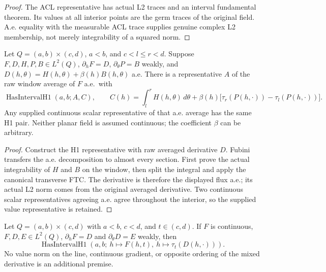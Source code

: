 \begin{proof}
\leanok
The ACL representative has actual L2 traces and an interval fundamental theorem.
Its values at all interior points are the germ traces of the original field.
A.e. equality with the measurable ACL trace supplies genuine complex L2
membership, not merely integrability of a squared norm.
\end{proof}

\begin{lemma}
\label{lem:rough-window-flux}
\leanok
Let $Q=(a,b)\times(c,d)$, $a<b$, and $c<l\le r<d$.
Suppose $F,D,H,P,B\in L^2(Q)$,
$\partial_hF=D$, $\partial_\theta P=B$ weakly, and
$D(h,\theta)=H(h,\theta)+\beta(h)B(h,\theta)$ a.e.
There is a representative $A$ of the raw window average of $F$ a.e.\ with
\[
 \operatorname{HasIntervalH1}(a,b;A,C),\qquad
 C(h)=\int_l^rH(h,\theta)\,d\theta+
       \beta(h)\bigl[\tau_r(P(h,\cdot))-\tau_l(P(h,\cdot))\bigr].
\]
Any supplied continuous scalar representative of that a.e. average has the
same H1 pair. Neither planar field is assumed continuous; the coefficient
$\beta$ can be arbitrary.
\end{lemma}

\begin{proof}
\leanok
Construct the H1 representative with raw averaged derivative $D$.
Fubini transfers the a.e. decomposition to almost every section.
First prove the actual integrability of $H$ and $B$ on the window, then
split the integral and apply the canonical transverse FTC.
The derivative is therefore the displayed flux a.e.; its actual L2 norm
comes from the original averaged derivative.
Two continuous scalar representatives agreeing a.e. agree throughout
the interior, so the supplied value representative is retained.
\end{proof}

\begin{lemma}
\label{lem:tangential-interior-trace}
\leanok
Let $Q=(a,b)\times(c,d)$ with $a<b$, $c<d$, and $t\in(c,d)$.
If $F$ is continuous, $F,D,E\in L^2(Q)$,
$\partial_hF=D$ and $\partial_\theta D=E$ weakly, then
\[
 \operatorname{HasIntervalH1}
   (a,b;\ h\mapsto F(h,t),\ h\mapsto\tau_t(D(h,\cdot))).
\]
No value norm on the line, continuous gradient, or opposite ordering of the
mixed derivative is an additional premise.
\end{lemma}

